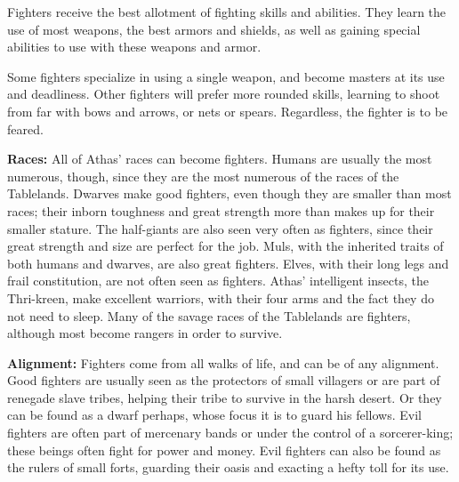 Fighters receive the best allotment of fighting skills and abilities. They learn the use of most weapons, the best armors and shields, as well as gaining special abilities to use with these weapons and armor.

Some fighters specialize in using a single weapon, and become masters at its use and deadliness. Other fighters will prefer more rounded skills, learning to shoot from far with bows and arrows, or nets or spears. Regardless, the fighter is to be feared.

\textbf{Races:} All of Athas' races can become fighters. Humans are usually the most numerous, though, since they are the most numerous of the races of the Tablelands. Dwarves make good fighters, even though they are smaller than most races; their inborn toughness and great strength more than makes up for their smaller stature. The half-giants are also seen very often as fighters, since their great strength and size are perfect for the job. Muls, with the inherited traits of both humans and dwarves, are also great fighters. Elves, with their long legs and frail constitution, are not often seen as fighters. Athas' intelligent insects, the Thri-kreen, make excellent warriors, with their four arms and the fact they do not need to sleep. Many of the savage races of the Tablelands are fighters, although most become rangers in order to survive.

\textbf{Alignment:} Fighters come from all walks of life, and can be of any alignment. Good fighters are usually seen as the protectors of small villagers or are part of renegade slave tribes, helping their tribe to survive in the harsh desert. Or they can be found as a dwarf perhaps, whose focus it is to guard his fellows. Evil fighters are often part of mercenary bands or under the control of a sorcerer-king; these beings often fight for power and money. Evil fighters can also be found as the rulers of small forts, guarding their oasis and exacting a hefty toll for its use.

